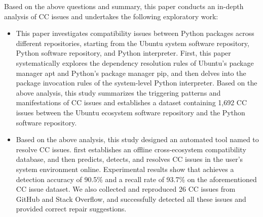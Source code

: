\begin{eabstract}
Based on the above questions and summary, this paper conducts an in-depth analysis of CC issues and undertakes the following exploratory work:
\begin{itemize}
	\item This paper investigates compatibility issues between Python packages across different repositories, starting from the Ubuntu system software repository, Python software repository, and Python interpreter.
	First, this paper systematically explores the dependency resolution rules of Ubuntu's package manager apt and Python's package manager pip, and then delves into the package invocation rules of the system-level Python interpreter.
	Based on the above analysis, this study summarizes the triggering patterns and manifestations of CC issues and establishes a dataset containing 1,692 CC issues between the Ubuntu ecosystem software repository and the Python software repository.
	\item Based on the above analysis, this study designed an automated tool named \tool{} to resolve CC issues.
	\tool{} first establishes an offline cross-ecosystem compatibility database, and then predicts, detects, and resolves CC issues in the user's system environment online.
	Experimental results show that \tool{} achieves a detection accuracy of 90.5\% and a recall rate of 93.7\% on the aforementioned CC issue dataset.
	We also collected and reproduced 26 CC issues from GitHub and Stack Overflow, and \tool{} successfully detected all these issues and provided correct repair suggestions.
\end{itemize}


\end{eabstract}

